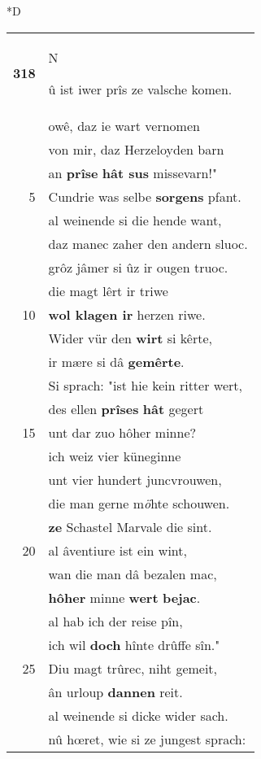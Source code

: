 \documentclass[8pt,a4paper,notitlepage]{article}
\begin{document}
\begin{table}[ht]
\begin{minipage}[t]{0.5\linewidth}
\small
\begin{center}*D
\end{center}
\begin{tabular}{rl}
\textbf{318} & \begin{large}N\end{large}û ist iwer prîs ze valsche komen.\\ 
 & owê, daz ie wart vernomen\\ 
 & von mir, daz Herzeloyden barn\\ 
 & an \textbf{prîse} \textbf{hât sus} missevarn!"\\ 
5 & Cundrie was selbe \textbf{sorgens} pfant.\\ 
 & al weinende si die hende want,\\ 
 & daz manec zaher den andern sluoc.\\ 
 & grôz jâmer si ûz ir ougen truoc.\\ 
 & die magt lêrt ir triwe\\ 
10 & \textbf{wol klagen ir} herzen riwe.\\ 
 & Wider vür den \textbf{wirt} si kêrte,\\ 
 & ir mære si dâ \textbf{gemêrte}.\\ 
 & Si sprach: "ist hie kein ritter wert,\\ 
 & des ellen \textbf{prîses} \textbf{hât} gegert\\ 
15 & unt dar zuo hôher minne?\\ 
 & ich weiz vier küneginne\\ 
 & unt vier hundert juncvrouwen,\\ 
 & die man gerne m\textit{ö}hte schouwen.\\ 
 & \textbf{ze} Schastel Marvale die sint.\\ 
20 & al âventiure ist ein wint,\\ 
 & wan die man dâ bezalen mac,\\ 
 & \textbf{hôher} minne \textbf{wert} \textbf{bejac}.\\ 
 & al hab ich der reise pîn,\\ 
 & ich wil \textbf{doch} hînte drûffe sîn."\\ 
25 & Diu magt trûrec, niht gemeit,\\ 
 & ân urloup \textbf{dannen} reit.\\ 
 & al weinende si dicke wider sach.\\ 
 & nû hœret, wie si ze jungest sprach:\\ 

\end{tabular}
\end{minipage}
\end{table}
\end{document}

